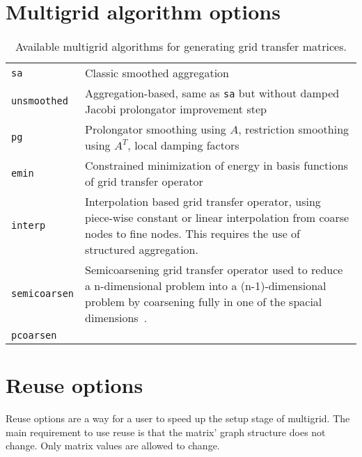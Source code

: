 

\section{Multigrid algorithm options}
\label{sec:options_mg}

\begin{table}[H]
  \begin{center}
    \begin{tabular}{p{3.5cm} p{11cm}}
      \toprule
      \verb!sa!          & Classic smoothed aggregation~\cite{VMB1996} \\
      \verb!unsmoothed!  & Aggregation-based, same as \verb!sa! but without damped Jacobi prolongator improvement step \\
      \verb!pg!          & Prolongator smoothing using $A$, restriction smoothing using $A^T$, local damping factors~\cite{ST2008} \\
      \verb!emin!        & Constrained minimization of energy in basis functions of grid transfer operator~\cite{WTWG2014,OST2011} \\
      \verb!interp!      & Interpolation based grid transfer operator, using piece-wise constant or linear interpolation from coarse nodes to fine nodes. This requires the use of structured aggregation.\\
      \verb!semicoarsen! & Semicoarsening grid transfer operator used to reduce a n-dimensional problem into a (n-1)-dimensional problem by coarsening fully in one of the spacial dimensions~\cite{TPSTP2015}.\\
      \verb!pcoarsen!    & \\
      \bottomrule
    \end{tabular}
    \caption{Available multigrid algorithms for generating grid transfer matrices. }
\label{t:mgs}
  \end{center}
\end{table}



\section{Reuse options}
\label{sec:options_reuse}

Reuse options are a way for a user to speed up the setup stage of multigrid.
The main requirement to use reuse is that the matrix' graph structure does not
change. Only matrix values are allowed to change.

